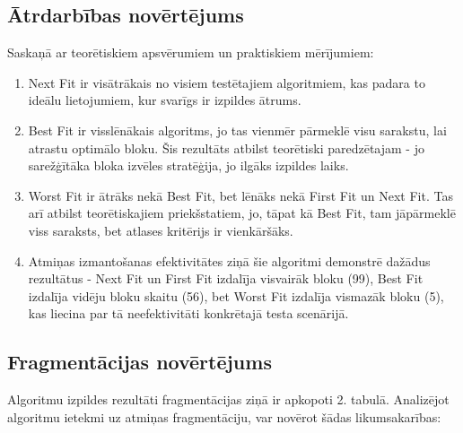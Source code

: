 \documentclass{report}
\begin{document}
	\subsection{Ātrdarbības novērtējums}
	
	Saskaņā ar teorētiskiem apsvērumiem un praktiskiem mērījumiem:
	
	\begin{enumerate}
		\item Next Fit ir visātrākais no visiem testētajiem algoritmiem, kas padara to ideālu lietojumiem, kur svarīgs ir izpildes ātrums.
		
		\item Best Fit ir visslēnākais algoritms, jo tas vienmēr pārmeklē visu sarakstu, lai atrastu optimālo bloku. Šis rezultāts atbilst teorētiski paredzētajam - jo sarežģītāka bloka izvēles stratēģija, jo ilgāks izpildes laiks.
		
		\item Worst Fit ir ātrāks nekā Best Fit, bet lēnāks nekā First Fit un Next Fit. Tas arī atbilst teorētiskajiem priekšstatiem, jo, tāpat kā Best Fit, tam jāpārmeklē viss saraksts, bet atlases kritērijs ir vienkāršāks.
		
		\item Atmiņas izmantošanas efektivitātes ziņā šie algoritmi demonstrē dažādus rezultātus - Next Fit un First Fit izdalīja visvairāk bloku (99), Best Fit izdalīja vidēju bloku skaitu (56), bet Worst Fit izdalīja vismazāk bloku (5), kas liecina par tā neefektivitāti konkrētajā testa scenārijā.
	\end{enumerate}
	
	\subsection{Fragmentācijas novērtējums}
	
	Algoritmu izpildes rezultāti fragmentācijas ziņā ir apkopoti 2. tabulā. Analizējot algoritmu ietekmi uz atmiņas fragmentāciju, var novērot šādas likumsakarības:
	
\end{document}

